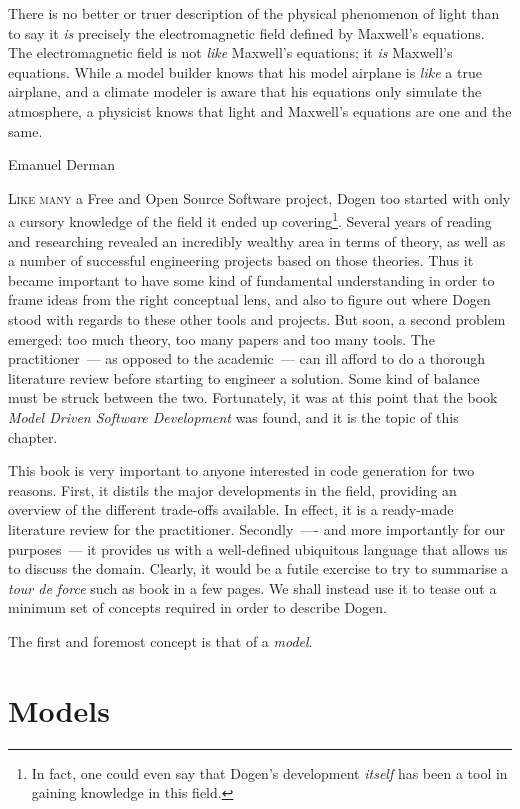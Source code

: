 \documentclass{book}
\begin{document}
\epigraph{There is no better or truer description of the physical
  phenomenon of light than to say it \emph{is} precisely the
  electromagnetic field defined by Maxwell's equations. The
  electromagnetic field is not \emph{like} Maxwell's equations; it
  \emph{is} Maxwell's equations. While a model builder knows that his
  model airplane is \emph{like} a true airplane, and a climate modeler
  is aware that his equations only simulate the atmosphere, a
  physicist knows that light and Maxwell's equations are one and the
  same.}{Emanuel Derman}

\lettrine{L}{ike many} a Free and Open Source Software project, Dogen
too started with only a cursory knowledge of the field it ended up
covering\footnote{In fact, one could even say that Dogen's development
  \emph{itself} has been a tool in gaining knowledge in this
  field.}. Several years of reading and researching revealed an
incredibly wealthy area in terms of theory, as well as a number of
successful engineering projects based on those theories. Thus it
became important to have some kind of fundamental understanding in
order to frame ideas from the right conceptual lens, and also to
figure out where Dogen stood with regards to these other tools and
projects. But soon, a second problem emerged: too much theory, too
many papers and too many tools. The practitioner~--- as opposed to the
academic~--- can ill afford to do a thorough literature review before
starting to engineer a solution. Some kind of balance must be struck
between the two. Fortunately, it was at this point that the book
\emph{Model Driven Software Development}\cite{2004model} was found,
and it is the topic of this chapter.

This book is very important to anyone interested in code generation
for two reasons. First, it distils the major developments in the
field, providing an overview of the different trade-offs available. In
effect, it is a ready-made literature review for the
practitioner. Secondly~---- and more importantly for our purposes~---
it provides us with a well-defined ubiquitous language that allows us
to discuss the domain. Clearly, it would be a futile exercise to try
to summarise a \emph{tour de force} such as \cite{2004model} book in a
few pages. We shall instead use it to tease out a minimum set of
concepts required in order to describe Dogen.

The first and foremost concept is that of a \emph{model}.

\section{Models}
\end{document}
